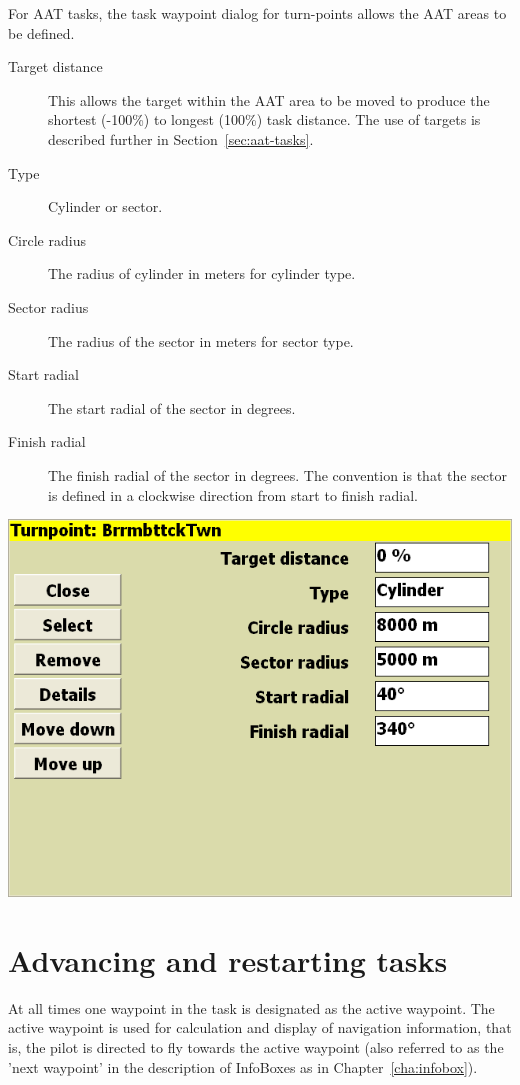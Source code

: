 \documentclass[a4paper,12pt]{refrep}
\begin{document}
For AAT tasks, the task waypoint dialog for turn-points allows the AAT
areas to be defined.
\begin{description}
\item[Target distance]  This allows the target within the AAT area to be moved to produce the shortest (-100\%) to longest (100\%) task distance.
The use of targets is described further in Section~\ref{sec:aat-tasks}.
\item[Type] Cylinder or sector.
\item[Circle radius] The radius of cylinder in meters for cylinder type.
\item[Sector radius] The radius of the sector in meters for sector type.
\item[Start radial] The start radial of the sector in degrees.
\item[Finish radial] The finish radial of the sector in degrees.
 The convention is that the sector is defined in a clockwise direction from
  start to finish radial.
\end{description}
\begin{center}
\includegraphics[angle=0,width=\linewidth,keepaspectratio='true']{figures/dialog-taskedit4.png}
\end{center}

\section{Advancing and restarting tasks}\label{sec:advanc-rest-tasks}

At all times one waypoint in the task is designated as the active
waypoint.  The active waypoint is used for calculation and display of
navigation information, that is, the pilot is directed to fly towards
the active waypoint (also referred to as the 'next waypoint' in the
description of InfoBoxes as in Chapter~\ref{cha:infobox}).
\end{document}
